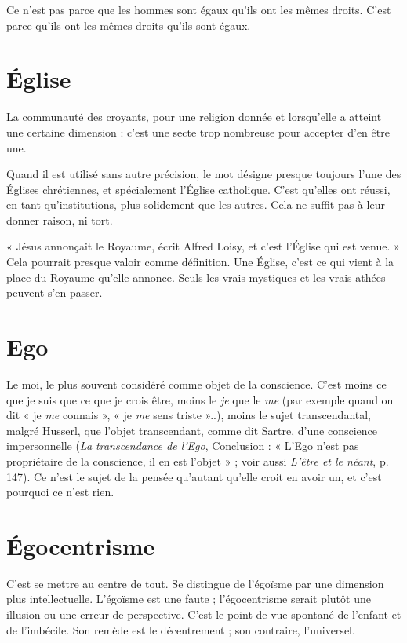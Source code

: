 Ce n’est pas parce que les hommes sont égaux qu’ils ont les mêmes droits.
C’est parce qu’ils ont les mêmes droits qu’ils sont égaux.

\section{Église}
La communauté des croyants, pour une religion donnée et lorsqu’elle
a atteint une certaine dimension : c’est une secte trop nombreuse
pour accepter d’en être une.

Quand il est utilisé sans autre précision, le mot désigne presque toujours
l’une des Églises chrétiennes, et spécialement l'Église catholique. C’est qu’elles
ont réussi, en tant qu’institutions, plus solidement que les autres. Cela ne suffit
pas à leur donner raison, ni tort.

« Jésus annonçait le Royaume, écrit Alfred Loisy, et c’est l'Église qui est
venue. » Cela pourrait presque valoir comme définition. Une Église, c’est ce
qui vient à la place du Royaume qu’elle annonce. Seuls les vrais mystiques et les
vrais athées peuvent s’en passer.

\section{Ego}
Le moi, le plus souvent considéré comme objet de la conscience. C’est
moins ce que je suis que ce que je crois être, moins le {\it je} que le {\it me} (par
exemple quand on dit « je {\it me} connais », « je {\it me} sens triste »..), moins le sujet
transcendantal, malgré Husserl, que l’objet transcendant, comme dit Sartre,
d’une conscience impersonnelle ({\it La transcendance de l'Ego}, Conclusion :
« L’Ego n’est pas propriétaire de la conscience, il en est l’objet » ; voir aussi
{\it L'être et le néant}, p. 147). Ce n’est le sujet de la pensée qu’autant qu’elle croit
en avoir un, et c’est pourquoi ce n’est rien.

\section{Égocentrisme}
C'est se mettre au centre de tout. Se distingue de
l’égoïsme par une dimension plus intellectuelle.
L’égoïsme est une faute ; l’égocentrisme serait plutôt une illusion ou une erreur
de perspective. C’est le point de vue spontané de l’enfant et de l’imbécile. Son
remède est le décentrement ; son contraire, l’universel.

